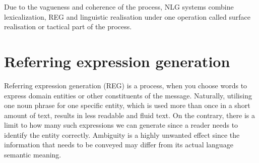 Due to the vagueness and coherence of the process, NLG systems combine lexicalization, REG and linguistic realisation under one operation called surface realisation or tactical part of the process.  

\section{Referring expression generation}
Referring expression generation (REG) is a process, when you choose words to express domain entities or other constituents of the message. Naturally, utilising one noun phrase for one specific entity, which is used more than once in a short amount of text, results in less readable and fluid text. On the contrary, there is a limit to how many such expressions we can generate since a reader needs to identify the entity correctly. Ambiguity is a highly unwanted effect since the information that needs to be conveyed may differ from its actual language semantic meaning.


